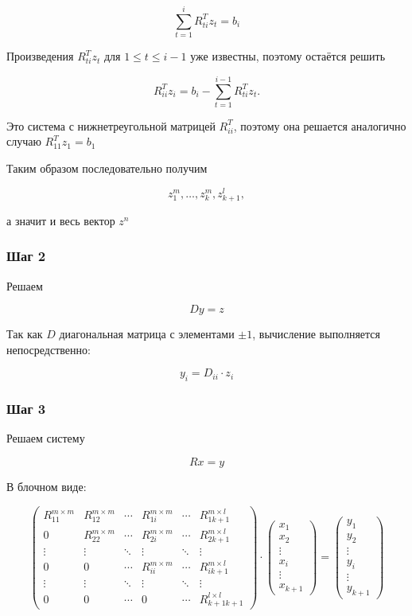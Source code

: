 \documentclass[a4paper,12pt]{article}
\begin{document}
$$
\sum_{t=1}^{i} R_{ti}^T z_t = b_i
$$

Произведения $R_{ti}^T z_t$ для $1 \leq t \leq i-1$ уже известны,
поэтому остаётся решить

$$
R_{ii}^T z_i
=
b_i
-
\sum_{t=1}^{i-1} R_{ti}^T z_t.
$$

Это система с нижнетреугольной матрицей $R_{ii}^T$, поэтому она
решается аналогично случаю $R_{11}^T z_1=b_1$

Таким образом последовательно получим

$$
z_1^m,\ldots,z_k^m,z_{k+1}^l,
$$

а значит и весь вектор $z^n$


\subsubsection{Шаг 2}

Решаем

$$
Dy=z
$$

Так как $D$ диагональная матрица с элементами $\pm1$, вычисление
выполняется непосредственно:

$$
y_i = D_{ii} \cdot z_i
$$


\subsubsection{Шаг 3}

Решаем систему

$$
Rx=y
$$

В блочном виде:

$$
\begin{pmatrix}
  R_{11}^{m \times m} & R_{12}^{m \times m} & \cdots & R_{1i}^{m \times m} & \cdots & R_{1k+1}^{m \times l} \\
  0 & R_{22}^{m \times m} & \cdots & R_{2i}^{m \times m} & \cdots & R_{2k+1}^{m \times l} \\
  \vdots & \vdots & \ddots & \vdots & \ddots & \vdots \\
  \hline
  0 & 0 & \cdots & R_{ii}^{m \times m} & \cdots & R_{ik+1}^{m \times l} \\
  \hline
  \vdots & \vdots & \ddots & \vdots & \ddots & \vdots \\
  0 & 0 & \cdots & 0 & \cdots & R_{k+1k+1}^{l \times l}
\end{pmatrix}
\cdot
\begin{pmatrix}
  x_1 \\
  x_2 \\
  \vdots \\
  x_i \\
  \vdots \\
  x_{k+1}
\end{pmatrix}
=
\begin{pmatrix}
  y_1 \\
  y_2 \\
  \vdots \\
  y_i \\
  \vdots \\
  y_{k+1}
\end{pmatrix}
$$
\end{document}
